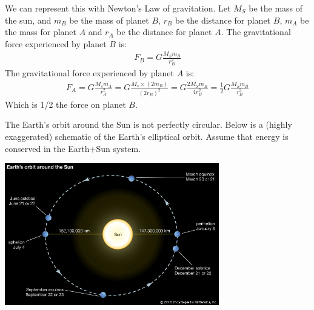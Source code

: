 \documentclass[12pt]{exam}
\begin{document}
\begin{questions}
\begin{parts}
\begin{TheSolution}
		We can represent this with Newton's Law of gravitation. Let $M_S$ be the mass of the sun, and $m_B$ be the mass of planet $B$, $r_B$ be the distance for planet $B$, $m_A$ be the mass for planet $A$ and $r_A$ be the distance for planet $A$. The gravitational force experienced by planet $B$ is:
		\begin{eqnarray}
		F_B = G \frac{M_S m_B}{r_B^2} \nonumber
		\end{eqnarray}
		The gravitational force experienced by planet $A$ is:
		\begin{eqnarray}
			F_A = G\frac{M_s m_A}{r_A^2} = G\frac{M_s \times (2 m_B)}{(2 r_B)^2}  = G\frac{2M_S m_B}{4 r_B^2} = \frac{1}{2} G\frac{M_S m_B}{r_B^2}\nonumber
		\end{eqnarray}
		Which is 1/2 the force on planet $B$.
	\end{TheSolution}
	
	\end{parts}

\question The Earth's orbit around the Sun is not perfectly circular. Below is a (highly exaggerated) schematic of the Earth's elliptical orbit. Assume that energy is conserved in the Earth+Sun system.
\begin{center}
	\includegraphics[width=0.7\textwidth]{../images/test2_seasons.jpg}
	\end{center}
\end{questions}
\end{document}
